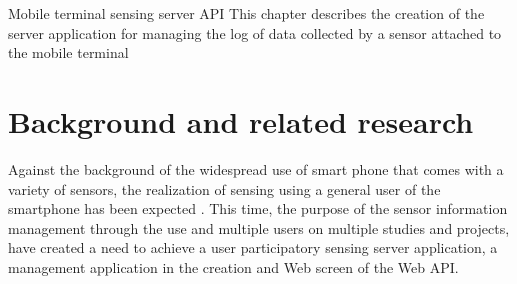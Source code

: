 \chapterhead
{Mobile terminal sensing server API}
{This chapter describes the creation of the server application for managing the log of data collected by a sensor attached to the mobile terminal}


\section{Background and related research}
Against the background of the widespread use of smart phone that comes with a variety of sensors, the realization of sensing using a general user of the smartphone has been expected \cite{usersencing}.
This time, the purpose of the sensor information management through the use and multiple users on multiple studies and projects, have created a need to achieve a user participatory sensing server application, a management application in the creation and Web screen of the Web API.

